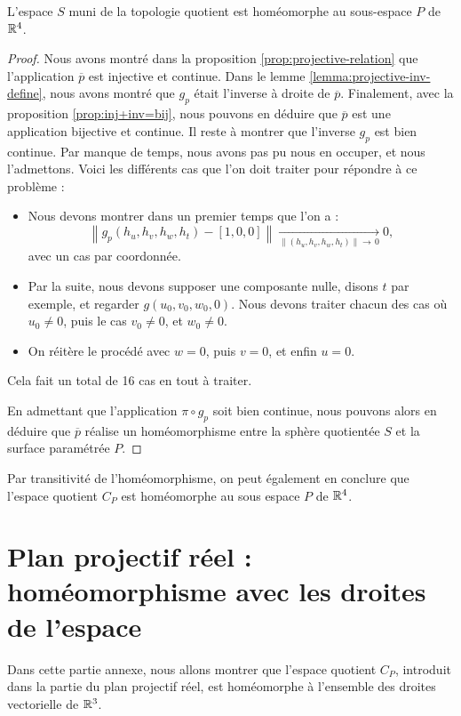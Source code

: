 \documentclass[hidelinks, 10pt]{article}
\begin{document}
\begin{theorem}
L'espace $S$ muni de la topologie quotient est homéomorphe au sous-espace $P$ de $\mathbb{R}^4$.
\end{theorem}
\begin{proof}
Nous avons montré dans la proposition \ref{prop:projective-relation} que l'application $\overline{p}$ est injective et continue. Dans le lemme \ref{lemma:projective-inv-define}, nous avons montré que $g_p$ était l'inverse à droite de $\overline{p}$. Finalement, avec la proposition \ref{prop:inj+inv=bij}, nous pouvons en déduire que $\overline{p}$ est une application bijective et continue. Il reste à montrer que l'inverse $g_p$ est bien continue. Par manque de temps, nous avons pas pu nous en occuper, et nous l'admettons. Voici les différents cas que l'on doit traiter pour répondre à ce problème :\begin{itemize}
    \item Nous devons montrer dans un premier temps que l'on a : \[\left \| g_p(h_u,h_v,h_w,h_t) -[1,0,0]\right \|\underset{\left \| (h_u,h_v,h_w,h_t) \right \|\rightarrow\, 0}{\longrightarrow}0,\]
    avec un cas par coordonnée.
    \item Par la suite, nous devons supposer une composante nulle, disons $t$ par exemple, et regarder $g(u_0,v_0,w_0,0)$. Nous devons traiter chacun des cas où $u_0\neq0$, puis le cas $v_0\neq0$, et $w_0\neq0$.
    \item On réitère le procédé avec $w=0$, puis $v=0$, et enfin $u=0$.
\end{itemize} Cela fait un total de 16 cas en tout à traiter.

\bigskip En admettant que l'application $\pi\circ g_p$ soit bien continue, nous pouvons alors en déduire que $\overline{p}$ réalise un homéomorphisme entre la sphère quotientée $S$ et la surface paramétrée $P$.
\end{proof}


Par transitivité de l'homéomorphisme, on peut également en conclure que l'espace quotient $C_P$ est homéomorphe au sous espace $P$ de $\mathbb{R}^4$.


\newpage
\appendix
\section{Plan projectif réel : homéomorphisme avec les droites de l'espace}

Dans cette partie annexe, nous allons montrer que l'espace quotient $C_P$, introduit dans la partie du plan projectif réel, est homéomorphe à l'ensemble des droites vectorielle de $\mathbb{R}^3$.
\end{document}
